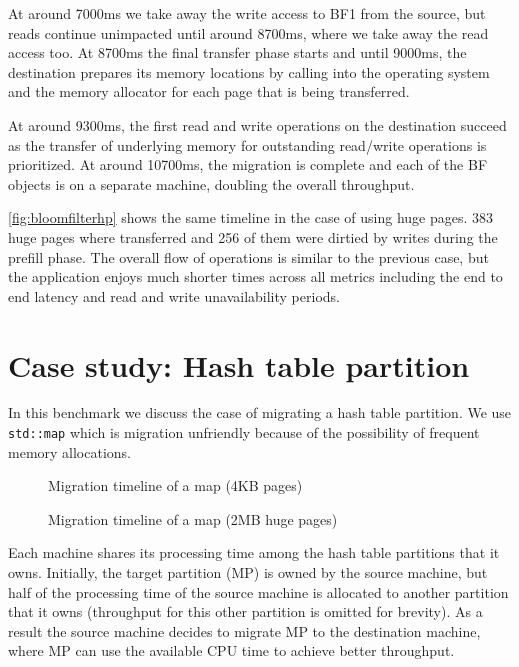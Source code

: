 At around 7000ms we take away the write access to BF1 from the source, but
reads continue unimpacted until around 8700ms, where we take away the read
access too. At 8700ms the final transfer phase starts and until 9000ms,
the destination prepares its memory locations by calling into the operating
system and the memory allocator for each page that is being transferred.

At around 9300ms, the first read and write operations on the destination
succeed as the transfer of underlying memory for outstanding read/write
operations is prioritized. At around 10700ms, the migration is complete and
each of the BF objects is on a separate machine, doubling the overall
throughput.


\autoref{fig:bloomfilterhp} shows the same timeline in the case of using
huge pages. 383 huge pages where transferred and 256 of them were dirtied
by writes during the prefill phase. The overall flow of operations is similar
to the previous case, but
the application enjoys much shorter times across all metrics including the
end to end latency and read and write unavailability periods.

\section{Case study: Hash table partition}
\label{sec:evalgenericobj}
In this benchmark we discuss the case of migrating a hash table partition. We
use \texttt{std::map} which is migration unfriendly because of the possibility
of frequent memory allocations.


\begin{figure}[tp]
    \begin{center}
        
    \end{center}
    \caption{Migration timeline of a map (4KB pages)}
    \label{fig:map}
\end{figure}

\begin{figure}[tp]
    \begin{center}
        
    \end{center}
    \caption{Migration timeline of a map (2MB huge pages)}
    \label{fig:maphp}
\end{figure}


Each machine shares its processing time among the hash table partitions that
it owns. Initially, the target partition (MP) is owned by the source machine, but half of
the processing time of the source machine is allocated to another partition that
it owns (throughput for this other partition is omitted for brevity). As a result
the source machine decides to migrate MP to the destination machine, where MP
can use the available CPU time to achieve better throughput.


